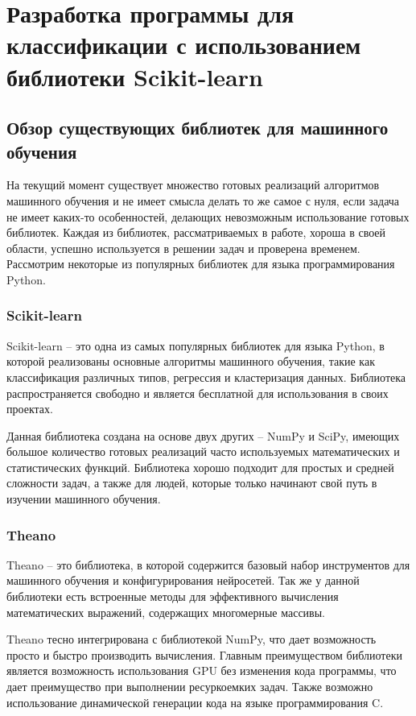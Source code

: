 \newpage
\section{\Large Разработка программы для классификации с использованием библиотеки Scikit-learn}\vspace{-7mm}
\subsection{Обзор существующих библиотек для машинного обучения}
На текущий момент существует множество готовых реализаций алгоритмов машинного обучения и не имеет смысла делать то же самое с нуля, если задача не имеет каких-то особенностей, делающих невозможным использование готовых библиотек. Каждая из библиотек, рассматриваемых в работе, хороша в своей области, успешно используется в решении задач и проверена временем. Рассмотрим некоторые из популярных библиотек для языка программирования Python.
\subsubsection{Scikit-learn}
Scikit-learn -- это одна из самых популярных библиотек для языка Python, в которой реализованы основные алгоритмы машинного обучения, такие как классификация различных типов, регрессия и кластеризация данных. Библиотека распространяется свободно и является бесплатной для использования в своих проектах.
\par
Данная библиотека создана на основе двух других -- NumPy и SciPy, имеющих большое количество готовых реализаций часто используемых математических и статистических функций. Библиотека хорошо подходит для простых и средней сложности задач, а также для людей, которые только начинают свой путь в изучении машинного обучения.
\subsubsection{Theano}
Theano -- это библиотека, в которой содержится базовый набор инструментов для машинного обучения и конфигурирования нейросетей. Так же у данной библиотеки есть встроенные методы для эффективного вычисления математических выражений, содержащих многомерные массивы.
\par
Theano тесно интегрирована с библиотекой NumPy, что дает возможность просто и быстро производить вычисления. Главным преимуществом библиотеки является возможность использования GPU без изменения кода программы, что дает преимущество при выполнении ресуркоемких задач. Также возможно использование динамической генерации кода на языке программирования C.
